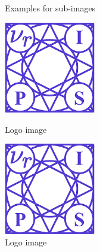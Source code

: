 \documentclass{article}
\begin{document}
\begin{figure}[H]
\centering
{} \quad \quad 
{} \quad
\caption{Examples for sub-images} \label{image2}
\end{figure}


\begin{figure}[H]
  \centering
  \begin{minipage}[b]{40mm}
    \includegraphics[width=40mm]{images/logo-neurips.png}
    \caption{Logo image}
    \label{image3}
  \end{minipage} 
  \quad \quad \quad \quad \quad
  \begin{minipage}[b]{40mm}
    \includegraphics[width=40mm]{images/logo-neurips.png}
    \caption{Logo image}
    \label{image4}
  \end{minipage}
\end{figure}
\end{document}
